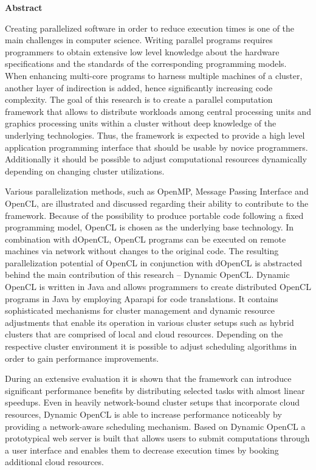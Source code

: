 \begin{center}\textsf{\textbf{Abstract}}\end{center}

\noindent Creating parallelized software in order to reduce execution times is one of the main challenges in computer science. Writing parallel programs requires programmers to obtain extensive low level knowledge about the hardware specifications and the standards of the corresponding programming models. When enhancing multi-core programs to harness multiple machines of a cluster, another layer of indirection is added, hence significantly increasing code complexity. The goal of this research is to create a parallel computation framework that allows to distribute workloads among central processing units and graphics processing units within a cluster without deep knowledge of the underlying technologies. Thus, the framework is expected to provide a high level application programming interface that should be usable by novice programmers. Additionally it should be possible to adjust computational resources dynamically depending on changing cluster utilizations.

Various parallelization methods, such as OpenMP, Message Passing Interface and OpenCL, are illustrated and discussed regarding their ability to contribute to the framework. Because of the possibility to produce portable code following a fixed programming model, OpenCL is chosen as the underlying base technology. In combination with dOpenCL, OpenCL programs can be executed on remote machines via network without changes to the original code. The resulting parallelization potential of OpenCL in conjunction with dOpenCL is abstracted behind the main contribution of this research -- Dynamic OpenCL. Dynamic OpenCL is written in Java and allows programmers to create distributed OpenCL programs in Java by employing Aparapi for code translations. It contains sophisticated mechanisms for cluster management and dynamic resource adjustments that enable its operation in various cluster setups such as hybrid clusters that are comprised of local and cloud resources. Depending on the respective cluster environment it is possible to adjust scheduling algorithms in order to gain performance improvements.

During an extensive evaluation it is shown that the framework can introduce significant performance benefits by distributing selected tasks with almost linear speedups. Even in heavily network-bound cluster setups that incorporate cloud resources, Dynamic OpenCL is able to increase performance noticeably by providing a network-aware scheduling mechanism. Based on Dynamic OpenCL a prototypical web server is built that allows users to submit computations through a user interface and enables them to decrease execution times by booking additional cloud resources.

